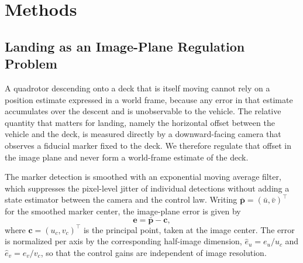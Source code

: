 
\section{Methods}

\subsection{Landing as an Image-Plane Regulation Problem}

A quadrotor descending onto a deck that is itself moving cannot rely on a position
estimate expressed in a world frame, because any error in that estimate accumulates over
the descent and is unobservable to the vehicle. The relative quantity that matters for
landing, namely the horizontal offset between the vehicle and the deck, is measured
directly by a downward-facing camera that observes a fiducial marker fixed to the deck.
We therefore regulate that offset in the image plane and never form a world-frame estimate
of the deck.

The marker detection is smoothed with an exponential moving average filter, which
suppresses the pixel-level jitter of individual detections without adding a state estimator
between the camera and the control law. Writing $\bar{\mathbf{p}} = (\bar{u}, \bar{v})^{\top}$
for the smoothed marker center, the image-plane error is given by
%
\begin{equation}
  \mathbf{e} = \bar{\mathbf{p}} - \mathbf{c},
  \label{eq:error}
\end{equation}
%
where $\mathbf{c} = (u_{c}, v_{c})^{\top}$ is the principal point, taken at the image
center. The error is normalized per axis by the corresponding half-image dimension,
$\hat{e}_{u} = e_{u}/u_{c}$ and $\hat{e}_{v} = e_{v}/v_{c}$, so that the control gains are
independent of image resolution.

